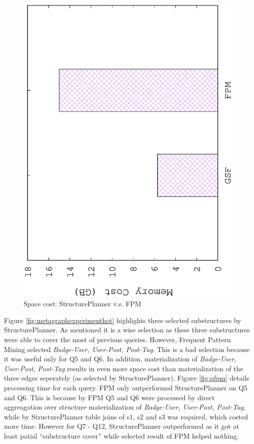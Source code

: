 \begin{figure}[H]
	\centering
	\includegraphics[scale=0.5, angle=270]{plot/fpm_space}
	\caption{Space cost: StructurePlanner v.s. FPM}
	\label{fig:fpmspace}
\end{figure}

Figure \ref{fig:metagraphexperimenthot} highlights three selected substructures by StructurePlanner. As mentioned it is a wise selection as these three substructures were able to cover the most of previous queries. However, Frequent Pattern Mining selected \textit{Badge-User, User-Post, Post-Tag}. This is a bad selection because it was useful only for Q5 and Q6. In addition, materialization of \textit{Badge-User, User-Post, Post-Tag} results in even more space cost than materialization of the three edges seperately (as selected by StructurePlanner). Figure \ref{fig:qfpm} details processing time for each query. FPM only outperformed StructurePlanner on Q5 and Q6. This is because by FPM Q5 and Q6 were processed by direct aggreagation over structure materialization of \textit{Badge-User, User-Post, Post-Tag}, while by StructurePlanner table joins of s1, s2 and s3 was required, which costed more time. However for Q7 - Q12, StructurePlanner outperformed as it got at least patial ``substructure cover'' while selected result of FPM helped nothing.

